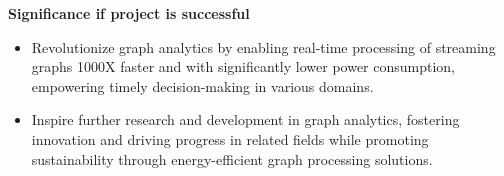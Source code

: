 \documentclass[usenames,dvipsnames]{beamer} %
\begin{document}
\begin{frame}
{{            }
        }%
        {
            \tiny{
                \textbf{Significance if project is successful}
                \begin{itemize}
                    \item Revolutionize graph analytics by enabling real-time processing of streaming graphs 1000X faster and with significantly lower power consumption, empowering timely decision-making in various domains.  
                    \item Inspire further research and development in graph analytics, fostering innovation and driving progress in related fields while promoting sustainability through energy-efficient graph processing solutions.
                \end{itemize} 
            }
        }
    \end{frame}
    
\end{document}
